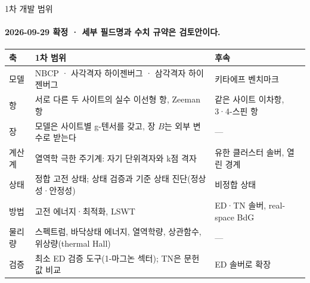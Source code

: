 \begin{frame}[label=first-scope]{1차 개발 범위}
  \framesubtitle{2026-09-29 확정 · 세부 필드명과 수치 규약은 검토안이다.}
  \small
  \begin{tabularx}{\textwidth}{@{}p{1.6cm}Yp{4.1cm}@{}}
    \toprule
    축 & 1차 범위 & 후속 \\
    \midrule
    모델 & NBCP · 사각격자 하이젠버그 · 삼각격자 하이젠버그 & 키타에프 벤치마크 \\
    항 & 서로 다른 두 사이트의 실수 이선형 항, Zeeman 항 & 같은 사이트 이차항, 3·4-스핀 항 \\
    장 & 모델은 사이트별 g-텐서를 갖고, 장 $B$는 외부 변수로 받는다 & — \\
    계산계 & 열역학 극한 주기계: 자기 단위격자와 k점 격자 & 유한 클러스터 솔버, 열린 경계 \\
    상태 & 정합 고전 상태; 상태 검증과 기준 상태 진단(정상성·안정성) & 비정합 상태 \\
    방법 & 고전 에너지·최적화, LSWT & ED·TN 솔버, real-space BdG \\
    물리량 & 스펙트럼, 바닥상태 에너지, 열역학량, 상관함수, 위상량(thermal Hall) & — \\
    검증 & 최소 ED 검증 도구(1-마그논 섹터); TN은 문헌값 비교 & ED 솔버로 확장 \\
    \bottomrule
  \end{tabularx}
  \par\medskip
\end{frame}
